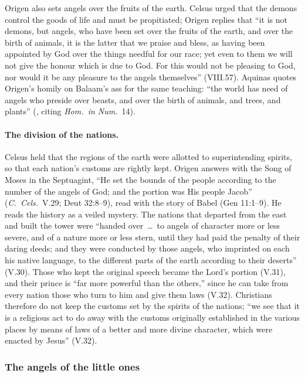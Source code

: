 \noindent Origen also sets angels over the fruits of the earth. Celsus
urged that the demons control the goods of life and must be propitiated;
Origen replies that ``it is not demons, but angels, who have been set over
the fruits of the earth, and over the birth of animals, it is the latter
that we praise and bless, as having been appointed by God over the things
needful for our race; yet even to them we will not give the honour which is
due to God. For this would not be pleasing to God, nor would it be any
pleasure to the angels themselves'' (VIII.57). Aquinas quotes Origen's
homily on Balaam's ass for the same teaching: ``the world has need of angels
who preside over beasts, and over the birth of animals, and trees, and
plants'' (, citing \emph{Hom.\ in Num.}\ 14).

\paragraph{The division of the nations.} Celsus held that the regions of
the earth were allotted to superintending spirits, so that each nation's
customs are rightly kept. Origen answers with the Song of Moses in the
Septuagint, ``He set the bounds of the people according to the number of
the angels of God; and the portion was His people Jacob'' (\emph{C.\
Cels.}\ V.29; Deut 32:8--9), read with the story of Babel (Gen 11:1--9).
He reads the history as a veiled mystery. The nations that
departed from the east and built the tower were ``handed over~\dots\ to
angels of character more or less severe, and of a nature more or less
stern, until they had paid the penalty of their daring deeds; and they
were conducted by those angels, who imprinted on each his native language,
to the different parts of the earth according to their deserts'' (V.30).
Those who kept the original speech became the Lord's portion (V.31), and
their prince is ``far more powerful than the others,'' since he can take
from every nation those who turn to him and give them laws (V.32).
Christians therefore do not keep the customs set by the spirits of the
nations; ``we see that it is a
religious act to do away with the customs originally established in the
various places by means of laws of a better and more divine character,
which were enacted by Jesus'' (V.32).

\subsubsection{The angels of the little ones}

